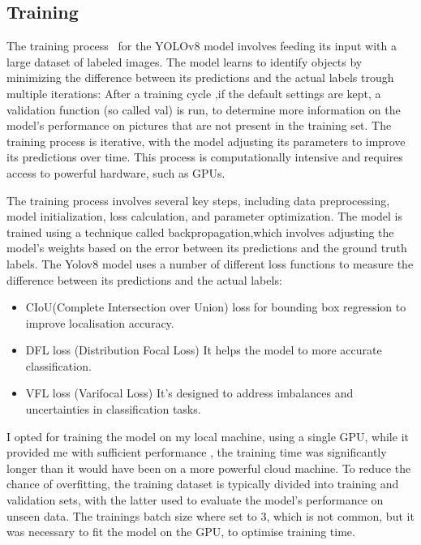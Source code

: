 
\subsection{Training}\label{subsec:training}
The training process~\cite{redmon2016lookonceunifiedrealtime} for the YOLOv8 model involves feeding its input with a large dataset of labeled images.
The model learns to identify objects by minimizing the difference between its predictions and the actual labels trough multiple iterations:
After a training cycle ,if the default settings are kept, a validation function (so called val) is run,
to determine more information on the model's performance on pictures that are not present in the training set.
The training process is iterative, with the model adjusting its parameters to improve its predictions over time.
This process is computationally intensive and requires access to powerful hardware, such as GPUs.

The training process involves several key steps, including data preprocessing, model initialization,
loss calculation, and parameter optimization.
The model is trained using a technique called backpropagation,which involves adjusting the model's weights based on
the error between its predictions and the ground truth labels.
The Yolov8 model uses a number of different loss functions to measure the difference between its predictions and the actual labels:

\begin{itemize}
\item CIoU(Complete Intersection over Union) loss for bounding box regression to improve localisation accuracy.
\item DFL loss (Distribution Focal Loss) It helps the model to more accurate classification.
\item VFL loss (Varifocal Loss) It's designed to address imbalances and uncertainties in classification tasks.
\end{itemize}


I opted for training the model on my local machine, using a single GPU, while it provided me with sufficient performance
, the training time was significantly longer than it would have been on a more powerful cloud machine.
To reduce the chance of overfitting, the training dataset is typically divided into training and validation sets,
with the latter used to evaluate the model's performance on unseen data.
The trainings batch size where set to 3, which is not common, but it was necessary to fit the model on the GPU,
to optimise training time.

